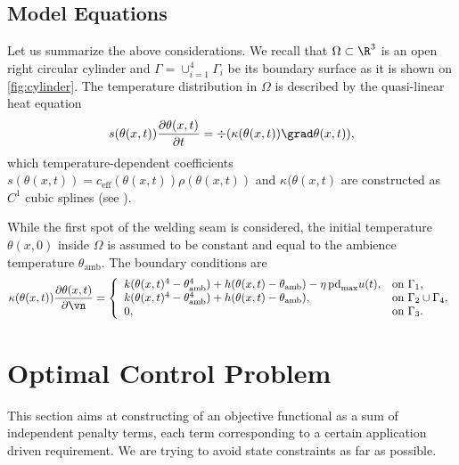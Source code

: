 \subsection{Model Equations}
\label{subsec:equations}


Let us summarize the above considerations.
We recall that $\Omega\subset \R^3$ is an open right circular cylinder and $\Gamma = \cup_{i=1}^4 \Gamma_i$ be its boundary surface as it is shown on \cref{fig:cylinder}. The temperature distribution in $\Omega$ is described by the quasi-linear heat equation
\begin{equation} \label{eq:heat_eq}
	s(\theta(x,t)) \frac{\partial \theta(x,t)}{\partial t} = \div (\kappa(\theta(x,t)) \grad\theta(x,t)),
\end{equation}
which temperature-dependent coefficients $s(\theta(x,t)) = c_\text{eff}(\theta(x,t)) \rho(\theta(x,t))$ and $\kappa(\theta(x,t)$ are constructed as $C^1$ cubic splines (see \cite[\texttt{optipuls.coefficients}]{optipuls_github}).

While the first spot of the welding seam is considered, the initial temperature $\theta(x,0)$ inside $\Omega$ is assumed to be constant and equal to the ambience temperature $\theta_\text{amb}$.
The boundary conditions are
\begin{equation} \label{eq:heat_eq_bc}
	\kappa(\theta(x,t)) \frac{\partial \theta(x,t)}{\partial \vn} = \left\{
		\begin{array}{ll}
			k (\theta(x,t)^4 - \theta_\text{amb}^4) + h (\theta(x,t) - \theta_\text{amb}) - \eta\, \text{pd}_{\max} u(t), & \text{on}\ \Gamma_1, \\
			k (\theta(x,t)^4 - \theta_\text{amb}^4) + h (\theta(x,t) - \theta_\text{amb}), & \text{on}\ \Gamma_2 \cup \Gamma_4, \\
			0, & \text{on}\ \Gamma_3.
		\end{array} \right.
\end{equation}

\section{Optimal Control Problem}
\label{sec:optimal_control_problem}

This section aims at constructing of an objective functional as a sum of independent penalty terms, each term corresponding to a certain application driven requirement.
We are trying to avoid state constraints as far as possible.

